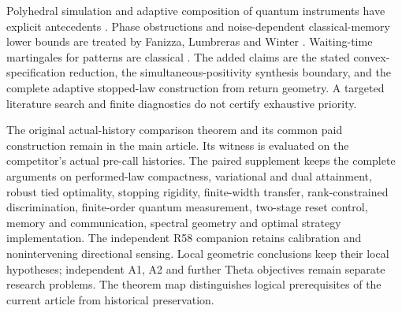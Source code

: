 Polyhedral simulation and adaptive composition of quantum instruments
have explicit antecedents \cite{MonrasWinter14,MonrasWinter16,Okay26}.
Phase obstructions and noise-dependent classical-memory lower bounds
are treated by Fanizza, Lumbreras and Winter \cite{Fanizza24}.
Waiting-time martingales for patterns are classical \cite{Li80}.
The added claims are the stated convex-specification reduction, the
simultaneous-positivity synthesis boundary, and the complete adaptive
stopped-law construction from return geometry. A targeted literature
search and finite diagnostics do not certify exhaustive priority.

The original actual-history comparison theorem and its common paid
construction remain in the main article. Its witness is evaluated on
the competitor's actual pre-call histories. The paired supplement keeps
the complete arguments on performed-law compactness, variational and
dual attainment, robust tied optimality, stopping rigidity, finite-width
transfer, rank-constrained discrimination, finite-order quantum
measurement, two-stage reset control, memory and communication,
spectral geometry and optimal strategy implementation. The independent
R58 companion retains calibration and nonintervening directional
sensing. Local geometric conclusions keep their local hypotheses;
independent A1, A2 and further Theta objectives remain separate
research problems. The theorem map distinguishes logical prerequisites
of the current article from historical preservation.
